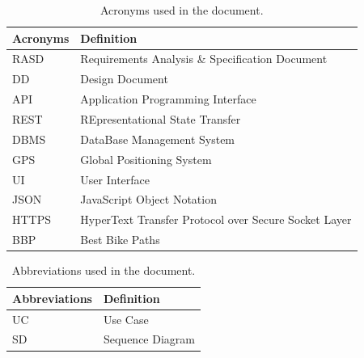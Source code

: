 \begin{table}[H]
\begin{center}
\begin{tabular}{ |l|l| }
\hline
\textbf{Acronyms} & \textbf{Definition}                              \\
\hline
RASD   & Requirements Analysis \& Specification Document   \\
\hline
DD     & Design Document   \\
\hline
API    & Application Programming Interface                  \\
\hline
REST   & REpresentational State Transfer   \\
\hline
DBMS   & DataBase Management System   \\
\hline
GPS    & Global Positioning System \\
\hline
UI     & User Interface \\
\hline
JSON   & JavaScript Object Notation  \\
\hline
HTTPS  & HyperText Transfer Protocol over Secure Socket Layer   \\
\hline
BBP    & Best Bike Paths \\
\hline
\end{tabular}
\caption{Acronyms used in the document.}
\label{tab:acronyms}%
\end{center}
\end{table}

\begin{table}[H]
\begin{center}
\begin{tabular}{ |l|l| }
\hline
\textbf{Abbreviations} & \textbf{Definition} \\
\hline
UC   & Use Case \\
\hline
SD   & Sequence Diagram  \\
\hline
\end{tabular}
\caption{Abbreviations used in the document.}
\label{tab:Abbreviations}%
\end{center}
\end{table}

